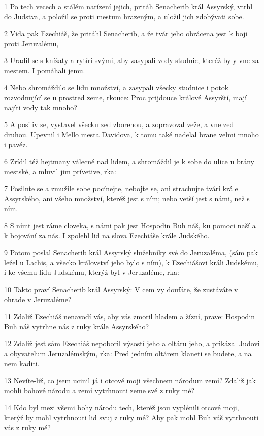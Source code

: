 \par 1 Po tech vecech a stálém narízení jejich, pritáh Senacherib král Assyrský, vtrhl do Judstva, a položil se proti mestum hrazeným, a uložil jich zdobývati sobe.
\par 2 Vida pak Ezechiáš, že pritáhl Senacherib, a že tvár jeho obrácena jest k boji proti Jeruzalému,
\par 3 Uradil se s knížaty a rytíri svými, aby zasypali vody studnic, kteréž byly vne za mestem. I pomáhali jemu.
\par 4 Nebo shromáždilo se lidu množství, a zasypali všecky studnice i potok rozvodnující se u prostred zeme, rkouce: Proc prijdouce králové Assyrští, mají najíti vody tak mnoho?
\par 5 A posiliv se, vystavel všecku zed zborenou, a zopravoval veže, a vne zed druhou. Upevnil i Mello mesta Davidova, k tomu také nadelal brane velmi mnoho i pavéz.
\par 6 Zrídil též hejtmany válecné nad lidem, a shromáždil je k sobe do ulice u brány mestské, a mluvil jim prívetive, rka:
\par 7 Posilnte se a zmužile sobe pocínejte, nebojte se, ani strachujte tvári krále Assyrského, ani všeho množství, kteréž jest s ním; nebo vetší jest s námi, než s ním.
\par 8 S nímt jest ráme cloveka, s námi pak jest Hospodin Buh náš, ku pomoci naší a k bojování za nás. I zpolehl lid na slova Ezechiáše krále Judského.
\par 9 Potom poslal Senacherib král Assyrský služebníky své do Jeruzaléma, (sám pak ležel u Lachis, a všecko království jeho bylo s ním), k Ezechiášovi králi Judskému, i ke všemu lidu Judskému, kterýž byl v Jeruzaléme, rka:
\par 10 Takto praví Senacherib král Assyrský: V cem vy doufáte, že zustáváte v ohrade v Jeruzaléme?
\par 11 Zdaliž Ezechiáš nenavodí vás, aby vás zmoril hladem a žízní, prave: Hospodin Buh náš vytrhne nás z ruky krále Assyrského?
\par 12 Zdaliž jest sám Ezechiáš nepoboril výsostí jeho a oltáru jeho, a prikázal Judovi a obyvatelum Jeruzalémským, rka: Pred jedním oltárem klaneti se budete, a na nem kaditi.
\par 13 Nevíte-liž, co jsem ucinil já i otcové moji všechnem národum zemí? Zdaliž jak mohli bohové národu a zemí vytrhnouti zeme své z ruky mé?
\par 14 Kdo byl mezi všemi bohy národu tech, kteréž jsou vyplénili otcové moji, kterýž by mohl vytrhnouti lid svuj z ruky mé? Aby pak mohl Buh váš vytrhnouti vás z ruky mé?

